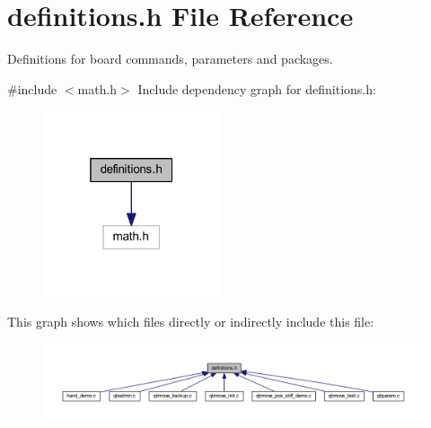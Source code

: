 \section{definitions.\+h File Reference}
\label{definitions_8h}


Definitions for board commands, parameters and packages.  


{\ttfamily \#include $<$math.\+h$>$}\newline
Include dependency graph for definitions.\+h\+:\nopagebreak
\begin{figure}[H]
\begin{center}
\leavevmode
\includegraphics[width=148pt]{definitions_8h__incl}
\end{center}
\end{figure}
This graph shows which files directly or indirectly include this file\+:\nopagebreak
\begin{figure}[H]
\begin{center}
\leavevmode
\includegraphics[width=350pt]{definitions_8h__dep__incl}
\end{center}
\end{figure}
